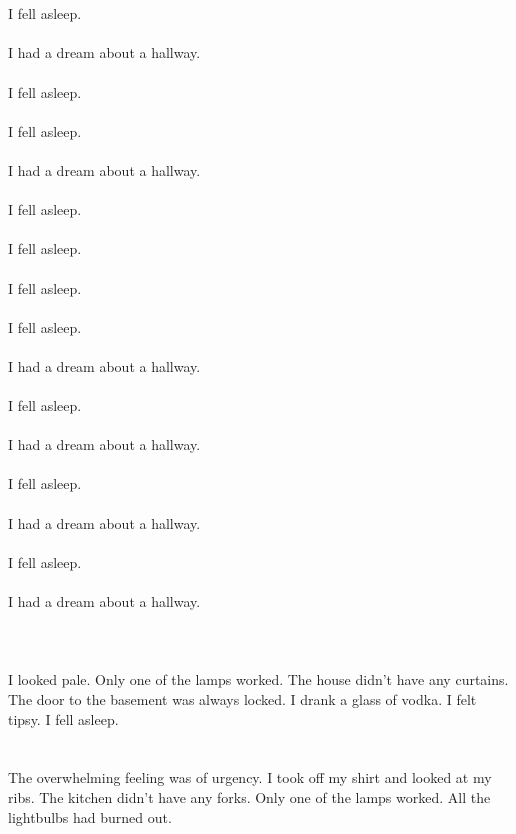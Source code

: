 \documentclass{article}
\begin{document}
    \section{}
    I fell asleep.\\\\I had a dream about a hallway.\\\\ I fell asleep.\\\\ I fell asleep.\\\\I had a dream about a hallway.\\\\ I fell asleep.\\\\ I fell asleep.\\\\ I fell asleep.\\\\ I fell asleep.\\\\I had a dream about a hallway.\\\\ I fell asleep.\\\\I had a dream about a hallway.\\\\ I fell asleep.\\\\I had a dream about a hallway.\\\\ I fell asleep.\\\\I had a dream about a hallway.\\\\ 
    \newpage
    
    \section{}
    I looked pale. Only one of the lamps worked. The house didn't have any curtains. The door to the basement was always locked. I drank a glass of vodka. I felt tipsy. I fell asleep.  
    \newpage
    
    \section{}
    The overwhelming feeling was of urgency. I took off my shirt and looked at my ribs. The kitchen didn't have any forks. Only one of the lamps worked. All the lightbulbs had burned out.  
    \newpage
    
\end{document}
